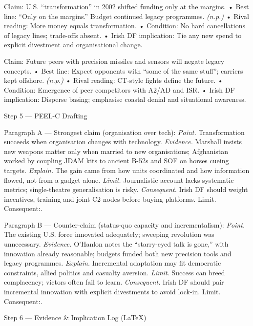 Claim: U.S. “transformation” in 2002 shifted funding only at the margins.
• Best line: “Only on the margins.” Budget continued legacy programmes. \emph{(n.p.)}
• Rival reading: More money equals transformation.
• Condition: No hard cancellations of legacy lines; trade-offs absent.
• Irish DF implication: Tie any new spend to explicit divestment and organisational change.

Claim: Future peers with precision missiles and sensors will negate legacy concepts.
• Best line: Expect opponents with “some of the same stuff”; carriers kept offshore. \emph{(n.p.)}
• Rival reading: CT-style fights define the future.
• Condition: Emergence of peer competitors with A2/AD and ISR.
• Irish DF implication: Disperse basing; emphasise coastal denial and situational awareness.

Step 5 — PEEL-C Drafting

Paragraph A — Strongest claim (organisation over tech):
\textit{Point.} Transformation succeeds when organisation changes with technology.
\textit{Evidence.} Marshall insists new weapons matter only when married to new organisations; Afghanistan worked by coupling JDAM kits to ancient B-52s and SOF on horses cueing targets.
\textit{Explain.} The gain came from how units coordinated and how information flowed, not from a gadget alone.
\textit{Limit.} Journalistic account lacks systematic metrics; single-theatre generalisation is risky.
\textit{Consequent.} Irish DF should weight incentives, training and joint C2 nodes before buying platforms. Limit. Consequent:.

Paragraph B — Counter-claim (status-quo capacity and incrementalism):
\textit{Point.} The existing U.S. force innovated adequately; sweeping revolution was unnecessary.
\textit{Evidence.} O’Hanlon notes the “starry-eyed talk is gone,” with innovation already reasonable; budgets funded both new precision tools and legacy programmes.
\textit{Explain.} Incremental adaptation may fit democratic constraints, allied politics and casualty aversion.
\textit{Limit.} Success can breed complacency; victors often fail to learn.
\textit{Consequent.} Irish DF should pair incremental innovation with explicit divestments to avoid lock-in. Limit. Consequent:.

Step 6 — Evidence \& Implication Log (LaTeX)

